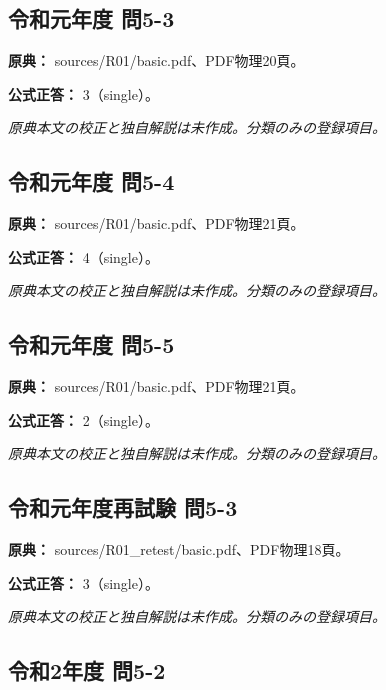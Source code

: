 \subsection{令和元年度 問5-3}
\label{q:r01-reg-basic-5-3}

\noindent\textbf{原典：} sources/R01/basic.pdf、PDF物理20頁。

\textbf{公式正答：} 3（single）。

\par\textit{原典本文の校正と独自解説は未作成。分類のみの登録項目。}

\subsection{令和元年度 問5-4}
\label{q:r01-reg-basic-5-4}

\noindent\textbf{原典：} sources/R01/basic.pdf、PDF物理21頁。

\textbf{公式正答：} 4（single）。

\par\textit{原典本文の校正と独自解説は未作成。分類のみの登録項目。}

\subsection{令和元年度 問5-5}
\label{q:r01-reg-basic-5-5}

\noindent\textbf{原典：} sources/R01/basic.pdf、PDF物理21頁。

\textbf{公式正答：} 2（single）。

\par\textit{原典本文の校正と独自解説は未作成。分類のみの登録項目。}

\subsection{令和元年度再試験 問5-3}
\label{q:r01-ret-basic-5-3}

\noindent\textbf{原典：} sources/R01\_retest/basic.pdf、PDF物理18頁。

\textbf{公式正答：} 3（single）。

\par\textit{原典本文の校正と独自解説は未作成。分類のみの登録項目。}

\subsection{令和2年度 問5-2}
\label{q:r02-reg-basic-5-2}

